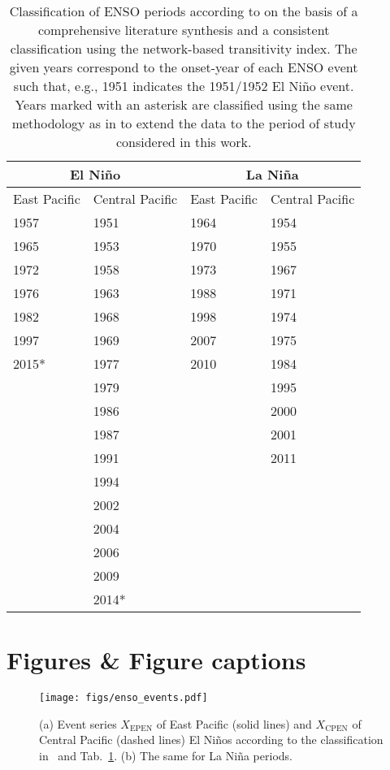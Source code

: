 \documentclass[utf8]{frontiersSCNS} %
\begin{document}
\begin{table}[h!]
\begin{tabular}{ p{2.5cm}  p{2.5cm}  p{2.5cm}  p{2.5cm}  }
 \hline
 \multicolumn{2}{c}{El Ni\~no} & \multicolumn{2}{c}{La Ni\~na} \\
 \hline\hline
 East Pacific & Central Pacific & East Pacific & Central Pacific\\
 \hline
 1957 & 1951 & 1964 & 1954\\
 1965 & 1953 & 1970 & 1955\\
 1972 & 1958 & 1973 & 1967\\
 1976 & 1963 & 1988 & 1971\\
 1982 & 1968 & 1998 & 1974\\
 1997 & 1969 & 2007 & 1975\\
 2015* & 1977 & 2010 & 1984\\
 & 1979 &  & 1995\\
 & 1986 &  & 2000\\
 & 1987 &  & 2001\\
 & 1991 &  & 2011\\
 & 1994 &  & \\
 & 2002 &  & \\
 & 2004 &  & \\
 & 2006 &  & \\
 & 2009 &  & \\
 & 2014* &  & \\
\hline
\end{tabular}
\caption{Classification of ENSO periods according to \cite{wiedermann_climate_2016} on the basis of a comprehensive literature synthesis and a consistent classification using the network-based transitivity index. The given years correspond to the onset-year of each ENSO event such that, e.g., 1951 indicates the 1951/1952 El Ni\~no event. Years marked with an asterisk are classified using the same methodology as in \cite{wiedermann_climate_2016} to extend the data to the period of study considered in this work.}
\label{tab:enso_years}
\end{table}

\newpage

\section*{Figures \& Figure captions}

\begin{figure}[h!]
  \centering
  \texttt{[image: figs/enso\_events.pdf]}
  \caption{(a) Event series $X_\text{EPEN}$ of East Pacific (solid lines) and $X_\text{CPEN}$ of Central Pacific (dashed lines) El Ni\~nos according to the classification in~\citet{wiedermann_climate_2016} and Tab.~\ref{tab:enso_years}. (b) The same for La Ni\~na periods.
  }
 \label{fig:indices}
\end{figure}
\end{document}
